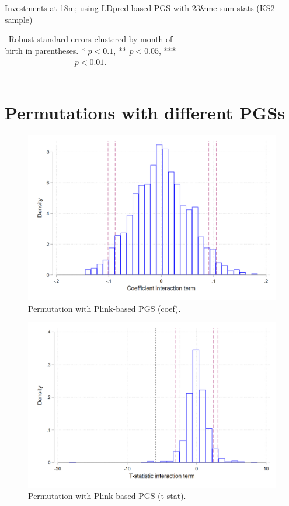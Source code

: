 \documentclass{article}
\begin{document}
\begin{table}[H]
\caption{Investments at 18m; using LDpred-based PGS with 23\&me sum stats (KS2 sample)}
\centering
{\scriptsize
\begin{tabular}{lcccccccccccccccccccc}
\toprule

\bottomrule
\addlinespace[.75ex]
\end{tabular}
}
\caption*{\noindent\scriptsize Robust standard errors clustered by month of birth in parentheses. * $p < 0.1$, ** $p < 0.05$, *** $p < 0.01$.}
\end{table}


\clearpage

\section{Permutations with different PGSs}

\begin{figure}[H]
\centering 
\includegraphics[width=0.9\linewidth]{../figures/permutation_coef_plink.png}
\caption{Permutation with Plink-based PGS (coef).}
\end{figure}

\begin{figure}[H]
\centering 
\includegraphics[width=0.9\linewidth]{../figures/permutation_tstat_plink.png}
\caption{Permutation with Plink-based PGS (t-stat).}
\end{figure}
\end{document}
